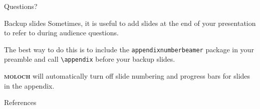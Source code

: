 \documentclass[10pt]{beamer}
\newcommand{\themename}{\textbf{\textsc{moloch}}\xspace}
\begin{document}
\begin{frame}[standout]
  Questions?
\end{frame}

\appendix

\begin{frame}[fragile]{Backup slides}
  Sometimes, it is useful to add slides at the end of your presentation to
  refer to during audience questions.

  The best way to do this is to include the \verb|appendixnumberbeamer|
  package in your preamble and call \verb|\appendix| before your backup slides.

  \themename will automatically turn off slide numbering and progress bars for
  slides in the appendix.
\end{frame}

\begin{frame}[allowframebreaks]{References}

  
  

\end{frame}
\end{document}
